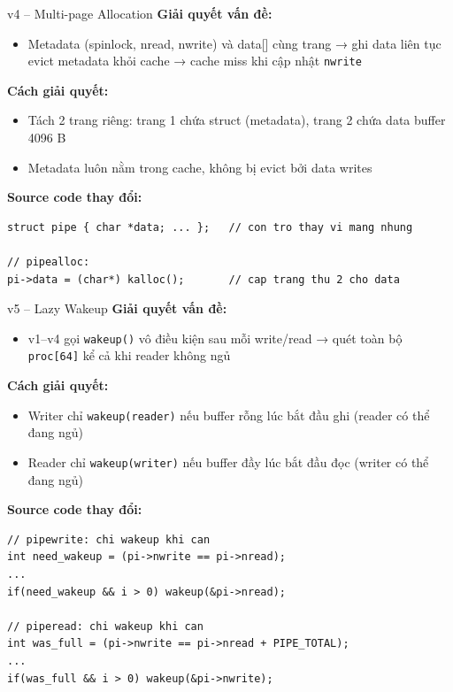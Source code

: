 \documentclass[aspectratio=169]{beamer}
\begin{document}
\begin{frame}[fragile]{v4 -- Multi-page Allocation}
    \textbf{Giải quyết vấn đề:}
    \begin{itemize}
        \item Metadata (spinlock, nread, nwrite) và data[] cùng trang → ghi data liên tục evict metadata khỏi cache → cache miss khi cập nhật \texttt{nwrite}
    \end{itemize}

    \vspace{0.4em}
    \textbf{Cách giải quyết:}
    \begin{itemize}\setlength\itemsep{3pt}
        \item Tách 2 trang riêng: trang 1 chứa struct (metadata), trang 2 chứa data buffer 4096 B
        \item Metadata luôn nằm trong cache, không bị evict bởi data writes
    \end{itemize}

    \vspace{0.4em}
    \textbf{Source code thay đổi:}
\begin{lstlisting}
struct pipe { char *data; ... };   // con tro thay vi mang nhung

// pipealloc:
pi->data = (char*) kalloc();       // cap trang thu 2 cho data
\end{lstlisting}
\end{frame}

\begin{frame}[fragile]{v5 -- Lazy Wakeup}
    \textbf{Giải quyết vấn đề:}
    \begin{itemize}
        \item v1--v4 gọi \texttt{wakeup()} vô điều kiện sau mỗi write/read → quét toàn bộ \texttt{proc[64]} kể cả khi reader không ngủ
    \end{itemize}

    \vspace{0.4em}
    \textbf{Cách giải quyết:}
    \begin{itemize}\setlength\itemsep{3pt}
        \item Writer chỉ \texttt{wakeup(reader)} nếu buffer rỗng lúc bắt đầu ghi (reader có thể đang ngủ)
        \item Reader chỉ \texttt{wakeup(writer)} nếu buffer đầy lúc bắt đầu đọc (writer có thể đang ngủ)
    \end{itemize}

    \vspace{0.4em}
    \textbf{Source code thay đổi:}
\begin{lstlisting}
// pipewrite: chi wakeup khi can
int need_wakeup = (pi->nwrite == pi->nread);
...
if(need_wakeup && i > 0) wakeup(&pi->nread);

// piperead: chi wakeup khi can
int was_full = (pi->nwrite == pi->nread + PIPE_TOTAL);
...
if(was_full && i > 0) wakeup(&pi->nwrite);
\end{lstlisting}
\end{frame}
\end{document}
